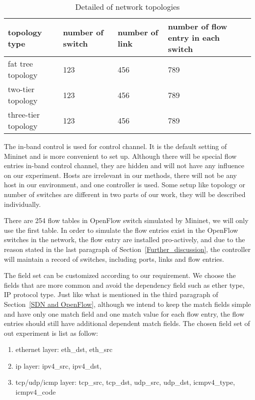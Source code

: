\begin{table}[H]
\centering
\caption{Detailed of network topologies}
\begin{tabular}{|l|p{4cm}|p{4.5cm}|p{4.5cm}|}
\hline  topology type & number of switch & number of link & number of flow entry in each switch \\
\hline fat tree topology & 123 & 456 & 789	\\
\hline two-tier topology & 123 & 456 & 789	\\
\hline three-tier topology & 123 & 456 & 789	\\
\hline 
\end{tabular}
\label{table:network_env}
\end{table}


The in-band control is used for control channel. It is the default setting of Mininet and is more convenient to set up. Although there will be special flow entries in-band control channel, they are hidden and will not have any influence on our experiment. Hosts are irrelevant in our methods, there will not be any host in our environment, and one controller is used. Some setup like topology or number of switches are different in two parts of our work, they will be described individually.

There are 254 flow tables in OpenFlow switch simulated by Mininet, we will only use the first table. In order to simulate the flow entries exist in the OpenFlow switches in the network, the flow entry are installed pro-actively, and due to the reason stated in the last paragraph of Section~\ref{Further_discussion}, the controller will maintain a record of switches, including ports, links and flow entries. 

The field set can be customized according to our requirement. We choose the fields that are more common and avoid the dependency field such as ether type, IP protocol type. Just like what is mentioned in the third paragraph of Section~\ref{SDN and OpenFlow}, although we intend to keep the match fields simple and have only one match field and one match value for each flow entry, the flow entries should still have additional dependent match fields. The chosen field set of out experiment is list as follow:
\begin{enumerate}
\item
ethernet layer: eth\_dst, eth\_src
\item
ip layer: ipv4\_src, ipv4\_dst, 
\item
tcp/udp/icmp layer: tcp\_src, tcp\_dst, udp\_src, udp\_dst, icmpv4\_type, icmpv4\_code
\end{enumerate}

